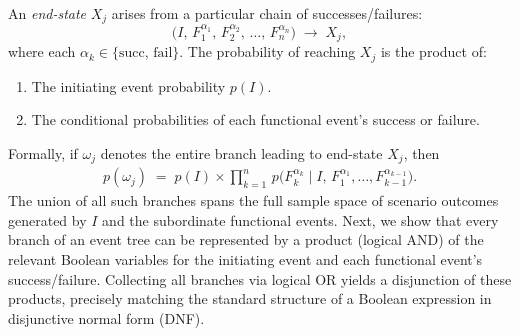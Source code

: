 An \emph{end-state} \(X_j\) arises from a particular chain of successes/failures:
\[
    \bigl(I,\,F_1^{\alpha_1},\,F_2^{\alpha_2},\,\ldots,\,F_n^{\alpha_n}\bigr)
    \;\longrightarrow\; 
    X_j,
\]
where each \(\alpha_k \in \{\text{succ},\,\text{fail}\}\). The probability of reaching \(X_j\) is the product of:
\begin{enumerate}
    \item The initiating event probability \(p(I)\).
    \item The conditional probabilities of each functional event's success or failure.
\end{enumerate}
Formally, if \(\omega_j\) denotes the entire branch leading to end-state \(X_j\), then
\begin{align}
\label{eq:event_tree_branch_probability}
    p(\omega_j)
    \;=\;
    p(I)
    \times
    \prod_{k=1}^{n}\,
    p\!\bigl(F_k^{\alpha_k}\mid 
             I,\,
             F_1^{\alpha_1},\ldots,
             F_{k-1}^{\alpha_{k-1}}\bigr).
\end{align}
The union of all such branches spans the full sample space of scenario outcomes generated by \(I\) and the subordinate functional events. Next, we show that every branch of an event tree can be represented by a product (logical AND) of the relevant Boolean variables for the initiating event and each functional event’s success/failure.  Collecting all branches via logical OR yields a disjunction of these products, precisely matching the standard structure of a Boolean expression in disjunctive normal form (DNF).

